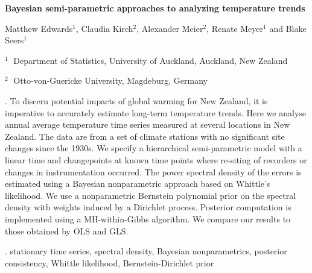 \documentclass[12pt]{article}
\begin{document}
\begin{flushleft}


{\LARGE\bf Bayesian semi-parametric approaches to analyzing temperature trends}


\vspace{1.0cm}

Matthew Edwards$^1$, Claudia Kirch$^2$, Alexander Meier$^2$, Renate Meyer$^1$ and Blake Seers$^1$

\begin{description}

\item $^1 \;$ Department of Statistics, University of Auckland,
Auckland, New Zealand

\item $^2 \;$  Otto-von-Guericke University, Magdeburg, Germany

\end{description}

\end{flushleft}


\vspace{0.75cm}

. 
To discern potential impacts of global warming for New Zealand, it is imperative to accurately estimate long-term temperature trends. Here we analyse annual average temperature time series measured at several locations in New Zealand. The data are from a set of climate stations with no significant site changes since the 1930s. We specify a hierarchical semi-parametric model with a linear time and changepoints at known time points where re-siting of recorders or changes in instrumentation occurred. The power spectral density of the errors is estimated using a Bayesian nonparametric approach based on Whittle’s likelihood.  We use a nonparametric Bernstein polynomial prior on the spectral density with weights induced by a Dirichlet process. 
Posterior computation is implemented using a MH-within-Gibbs algorithm. We compare our results to those obtained by OLS and GLS.

\vskip 2mm

.
stationary time series, spectral density, Bayesian nonparametrics, posterior consistency, Whittle likelihood, Bernstein-Dirichlet prior
\end{document}
